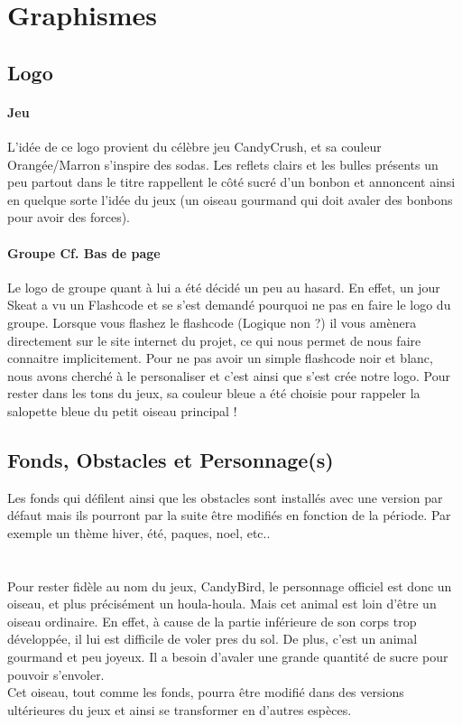 \documentclass [11pt]{report}
\begin{document}
\newpage 

	


	\section{Graphismes}
		\subsection {Logo}
			\paragraph{Jeu}
				L'idée de ce logo provient du célèbre jeu CandyCrush, et sa couleur Orangée/Marron s'inspire des sodas. Les reflets clairs et les bulles présents un peu partout dans le titre rappellent le côté sucré d'un bonbon et annoncent ainsi en quelque sorte l'idée du jeux (un oiseau gourmand qui doit avaler des bonbons pour 				avoir des forces). \\

			\paragraph{Groupe Cf. Bas de page}
				Le logo de groupe quant à lui a été décidé un peu au hasard. En effet, un jour Skeat a vu un Flashcode et se s'est demandé pourquoi ne pas en faire le logo du groupe. Lorsque vous flashez le flashcode (Logique non ?) il vous amènera directement sur le site internet du projet, ce qui nous permet de nous 				faire connaitre implicitement. Pour ne pas avoir un simple flashcode noir et blanc, nous avons cherché à le personaliser et c'est ainsi que s'est crée notre logo. Pour rester dans les tons du jeux, sa couleur bleue a été choisie pour rappeler la salopette bleue du petit oiseau principal !\\\vspace{5mm}

		\subsection {Fonds, Obstacles et Personnage(s)}
	 		Les fonds qui défilent ainsi que les obstacles sont installés avec une version par défaut mais ils pourront par la suite être modifiés en fonction de la période. Par exemple un thème hiver, été, paques, noel, etc..\\\\\\
 			\indent Pour rester fidèle au nom du jeux, CandyBird, le personnage officiel est donc un oiseau, et plus précisément un houla-houla.
Mais cet animal est loin d'être un oiseau ordinaire. En effet, à cause de la partie inférieure de son corps trop développée, il lui est difficile de voler pres du sol. De plus, c'est un animal gourmand et peu joyeux. Il a besoin d'avaler une grande quantité de sucre pour pouvoir s'envoler.\\
			\indent Cet oiseau, tout comme les fonds, pourra être modifié dans des versions ultérieures du jeux et ainsi se transformer en d'autres espèces.\\\vspace{5mm}
\end{document}
